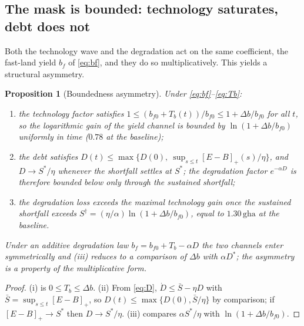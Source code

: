 \documentclass[preprint,12pt,authoryear]{elsarticle}
\newtheorem{proposition}{Proposition}
\newcommand{\pos}[1]{\left[#1\right]_+}
\begin{document}
\subsection{The mask is bounded: technology saturates, debt does not}\label{sec:bounded}

Both the technology wave and the degradation act on the same coefficient, the fast-land yield $b_f$ of \eqref{eq:bf}, and they do so multiplicatively. This yields a structural asymmetry.

\begin{proposition}[Boundedness asymmetry]\label{prop:bounded}
Under \eqref{eq:bf}--\eqref{eq:Tb}:
\begin{enumerate}[label=(\roman*)]
\item the technology factor satisfies $1\le(b_{f0}+T_b(t))/b_{f0}\le1+\Delta b/b_{f0}$ for all $t$, so the logarithmic gain of the yield channel is bounded by $\ln(1+\Delta b/b_{f0})$ uniformly in time ($0.78$ at the baseline);
\item the debt satisfies $D(t)\le\max\{D(0),\ \sup_{s\le t}\pos{E-B}(s)/\eta\}$, and $D\to S^*/\eta$ whenever the shortfall settles at $S^*$; the degradation factor $e^{-\alpha D}$ is therefore bounded below only through the sustained shortfall;
\item the degradation loss exceeds the maximal technology gain once the sustained shortfall exceeds $S^\dagger=(\eta/\alpha)\ln(1+\Delta b/b_{f0})$, equal to $1.30\,\mathrm{gha}$ at the baseline.
\end{enumerate}
Under an additive degradation law $b_f=b_{f0}+T_b-\alpha D$ the two channels enter symmetrically and (iii) reduces to a comparison of $\Delta b$ with $\alpha D^*$; the asymmetry is a property of the multiplicative form.
\end{proposition}

\begin{proof}
(i) is $0\le T_b\le\Delta b$. (ii) From \eqref{eq:D}, $\dot D\le\bar S-\eta D$ with $\bar S=\sup_{s\le t}\pos{E-B}$, so $D(t)\le\max\{D(0),\bar S/\eta\}$ by comparison; if $\pos{E-B}\to S^*$ then $D\to S^*/\eta$. (iii) compares $\alpha S^*/\eta$ with $\ln(1+\Delta b/b_{f0})$.
\end{proof}
\end{document}

